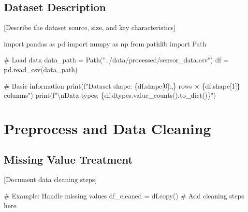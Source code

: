 \documentclass[
  letterpaper,
  DIV=11,
  numbers=noendperiod]{scrartcl}
\newenvironment{Shaded}{\begin{snugshade}}{\end{snugshade}}
\newcommand{\BuiltInTok}[1]{\textcolor[rgb]{0.00,0.23,0.31}{#1}}
\newcommand{\CharTok}[1]{\textcolor[rgb]{0.13,0.47,0.30}{#1}}
\newcommand{\CommentTok}[1]{\textcolor[rgb]{0.37,0.37,0.37}{#1}}
\newcommand{\DecValTok}[1]{\textcolor[rgb]{0.68,0.00,0.00}{#1}}
\newcommand{\ImportTok}[1]{\textcolor[rgb]{0.00,0.46,0.62}{#1}}
\newcommand{\NormalTok}[1]{\textcolor[rgb]{0.00,0.23,0.31}{#1}}
\newcommand{\OperatorTok}[1]{\textcolor[rgb]{0.37,0.37,0.37}{#1}}
\newcommand{\SpecialCharTok}[1]{\textcolor[rgb]{0.37,0.37,0.37}{#1}}
\newcommand{\SpecialStringTok}[1]{\textcolor[rgb]{0.13,0.47,0.30}{#1}}
\newcommand{\StringTok}[1]{\textcolor[rgb]{0.13,0.47,0.30}{#1}}
\renewenvironment{Shaded}{%
  \begin{tcolorbox}[%
    enhanced,%
    colback=codebg,%
    colframe=codebg,%
    borderline west={3pt}{0pt}{sectionblue},%
    fontupper=\small\ttfamily,%
    boxrule=0pt,%
    arc=0pt,%
    boxsep=5pt,%
    left=2mm,%
    right=2mm,%
    top=2mm,%
    bottom=2mm%
  ]%
}{%
  \end{tcolorbox}%
}
\begin{document}
\subsection{Dataset Description}\label{dataset-description}

{[}Describe the dataset source, size, and key characteristics{]}

\begin{Shaded}
\begin{Highlighting}[]
\ImportTok{import}\NormalTok{ pandas }\ImportTok{as}\NormalTok{ pd}
\ImportTok{import}\NormalTok{ numpy }\ImportTok{as}\NormalTok{ np}
\ImportTok{from}\NormalTok{ pathlib }\ImportTok{import}\NormalTok{ Path}

\CommentTok{\# Load data}
\NormalTok{data\_path }\OperatorTok{=}\NormalTok{ Path(}\StringTok{"../data/processed/sensor\_data.csv"}\NormalTok{)}
\NormalTok{df }\OperatorTok{=}\NormalTok{ pd.read\_csv(data\_path)}

\CommentTok{\# Basic information}
\BuiltInTok{print}\NormalTok{(}\SpecialStringTok{f"Dataset shape: }\SpecialCharTok{\{}\NormalTok{df}\SpecialCharTok{.}\NormalTok{shape[}\DecValTok{0}\NormalTok{]}\SpecialCharTok{:,\}}\SpecialStringTok{ rows × }\SpecialCharTok{\{}\NormalTok{df}\SpecialCharTok{.}\NormalTok{shape[}\DecValTok{1}\NormalTok{]}\SpecialCharTok{\}}\SpecialStringTok{ columns"}\NormalTok{)}
\BuiltInTok{print}\NormalTok{(}\SpecialStringTok{f"}\CharTok{\textbackslash{}n}\SpecialStringTok{Data types: }\SpecialCharTok{\{}\NormalTok{df}\SpecialCharTok{.}\NormalTok{dtypes}\SpecialCharTok{.}\NormalTok{value\_counts()}\SpecialCharTok{.}\NormalTok{to\_dict()}\SpecialCharTok{\}}\SpecialStringTok{"}\NormalTok{)}
\end{Highlighting}
\end{Shaded}

\section{Preprocess and Data
Cleaning}\label{preprocess-and-data-cleaning}

\subsection{Missing Value Treatment}\label{missing-value-treatment}

{[}Document data cleaning steps{]}

\begin{Shaded}
\begin{Highlighting}[]
\CommentTok{\# Example: Handle missing values}
\NormalTok{df\_cleaned }\OperatorTok{=}\NormalTok{ df.copy()}
\CommentTok{\# Add cleaning steps here}
\end{Highlighting}
\end{Shaded}
\end{document}
